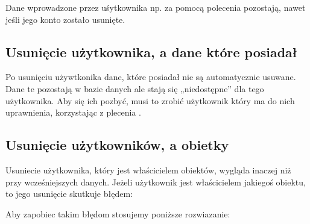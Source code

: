 \documentclass[a4paper,11pt,polish]{sphinxmanual}
\begin{document}
\begin{sphinxVerbatim}[commandchars=\\\{\}]
  
\end{sphinxVerbatim}

\sphinxAtStartPar
Dane wprowadzone przez uśytkownika np. za pomocą polecenia  pozostają, nawet jeśli jego konto zostało usunięte.


\subsection{Usunięcie użytkownika, a dane które posiadał}
\label{\detokenize{Bezpieczenstwo/index:usuniecie-uzytkownika-a-dane-ktore-posiadal}}
\sphinxAtStartPar
Po usunięciu używtkonika dane, które posiadał nie są automatycznie usuwane. Dane te pozostają w bazie danych ale stają się „niedostępne” dla tego użytkownika. Aby się ich pozbyć, musi to zrobić użytkownik który ma do nich uprawnienia, korzystając z plecenia .


\subsection{Usunięcie użytkowników, a obietky}
\label{\detokenize{Bezpieczenstwo/index:usuniecie-uzytkownikow-a-obietky}}
\sphinxAtStartPar
Usuniecie użytkownika, który jest właścicielem obiektów, wygląda inaczej niż przy wcześniejszych danych. Jeżeli użytkownik jest właścicielem jakiegoś obiektu, to jego usunięcie skutkuje błędem:

\begin{sphinxVerbatim}[commandchars=\\\{\}]
           
\end{sphinxVerbatim}

\sphinxAtStartPar
Aby zapobiec takim błędom stosujemy poniższe rozwiazanie:

\begin{sphinxVerbatim}[commandchars=\\\{\}]
     
   
  
\end{sphinxVerbatim}
\end{document}
